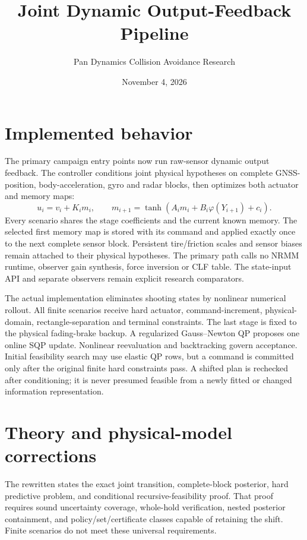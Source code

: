 \documentclass[11pt]{article}
\title{Joint Dynamic Output-Feedback Pipeline}
\author{Pan Dynamics Collision Avoidance Research}
\date{November 4, 2026}
\begin{document}
\maketitle

\section*{Implemented behavior}
The primary campaign entry points now run raw-sensor dynamic output feedback.
The controller conditions joint physical hypotheses on complete GNSS-position,
body-acceleration, gyro and radar blocks, then optimizes both actuator and
memory maps:
\[
 u_i=v_i+K_i m_i,\qquad m_{i+1}=\tanh(A_i m_i+B_i\varphi(Y_{i+1})+c_i).
\]
Every scenario shares the stage coefficients and the current known memory.
The selected first memory map is stored with its command and applied exactly
once to the next complete sensor block. Persistent tire/friction scales and
sensor biases remain attached to their physical hypotheses. The primary path
calls no NRMM runtime, observer gain synthesis, force inversion or CLF table.
The state-input API and separate observers remain explicit research comparators.

The actual implementation eliminates shooting states by nonlinear numerical
rollout. All finite scenarios receive hard actuator, command-increment,
physical-domain, rectangle-separation and terminal constraints. The last stage
is fixed to the physical fading-brake backup. A regularized Gauss--Newton QP
proposes one online SQP update. Nonlinear reevaluation and backtracking govern
acceptance. Initial feasibility search may use elastic QP rows, but a command
is committed only after the original finite hard constraints pass. A shifted
plan is rechecked after conditioning; it is never presumed feasible from a
newly fitted or changed information representation.

\section*{Theory and physical-model corrections}
The rewritten  states the exact joint
transition, complete-block posterior, hard predictive problem, and conditional
recursive-feasibility proof. That proof requires sound uncertainty coverage,
whole-hold verification, nested posterior containment, and policy/set/certificate
classes capable of retaining the shift. Finite scenarios do not meet these
universal requirements.
\end{document}
